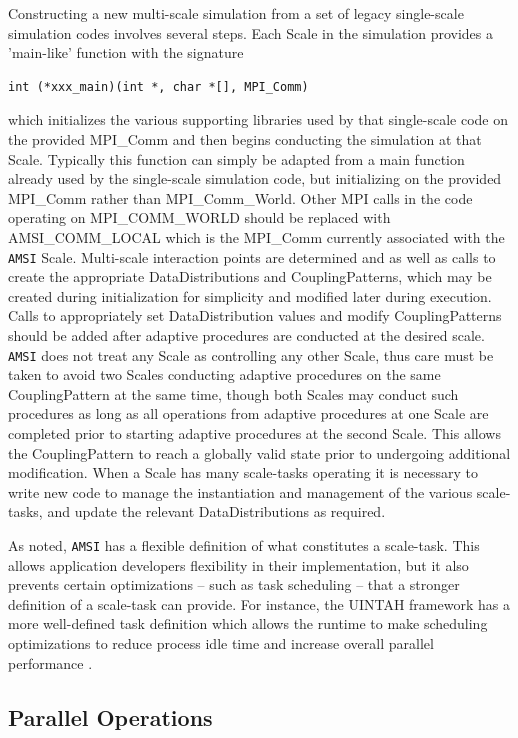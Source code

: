 \documentclass[11pt]{article}
\begin{document}
Constructing a new multi-scale simulation from a set of legacy single-scale simulation codes involves several steps.
Each Scale in the simulation provides a 'main-like' function with the signature
\begin{verbatim}
int (*xxx_main)(int *, char *[], MPI_Comm)
\end{verbatim}
which initializes the various supporting libraries used by that single-scale code on the provided MPI\_Comm and then begins conducting the simulation at that Scale.
Typically this function can simply be adapted from a main function already used by the single-scale simulation code, but initializing on the provided MPI\_Comm rather than MPI\_Comm\_World.
Other MPI calls in the code operating on MPI\_COMM\_WORLD should be replaced with AMSI\_COMM\_LOCAL which is the MPI\_Comm currently associated with the \verb|AMSI| Scale.
Multi-scale interaction points are determined and as well as calls to create the appropriate DataDistributions and CouplingPatterns, which may be created during initialization for simplicity and modified later during execution.
Calls to appropriately set DataDistribution values and modify CouplingPatterns should be added after adaptive procedures are conducted at the desired scale.
\verb|AMSI| does not treat any Scale as controlling any other Scale, thus care must be taken to avoid two Scales conducting adaptive procedures on the same CouplingPattern at the same time, though both Scales may conduct such procedures as long as all operations from adaptive procedures at one Scale are completed prior to starting adaptive procedures at the second Scale.
This allows the CouplingPattern to reach a globally valid state prior to undergoing additional modification.
When a Scale has many scale-tasks operating it is necessary to write new code to manage the instantiation and management of the various scale-tasks, and update the relevant DataDistributions as required.

As noted, \verb|AMSI| has a flexible definition of what constitutes a scale-task.
This allows application developers flexibility in their implementation, but it also prevents certain optimizations -- such as task scheduling -- that a stronger definition of a scale-task can provide.
For instance, the UINTAH framework \cite{davison2000uintah} has a more well-defined task definition which allows the runtime to make scheduling optimizations to reduce process idle time and increase overall parallel performance \cite{meng2010dynamic}.

\subsection{Parallel Operations}\label{paralle_ops}
\end{document}
